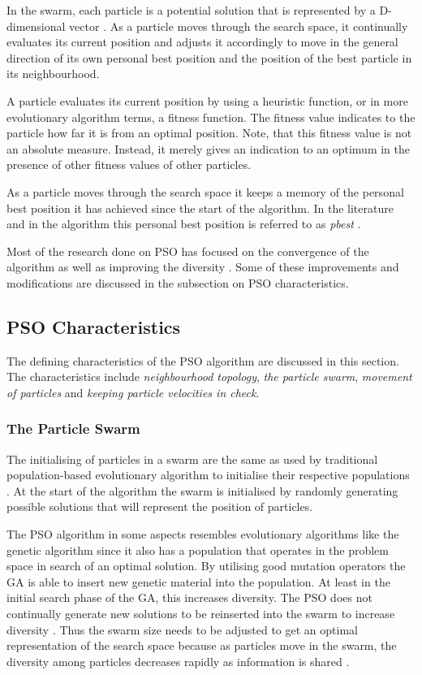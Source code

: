 In the swarm, each particle is a potential solution that is represented by a D-dimensional vector \cite{PSOHybridJobShop,PSOSelfHierarch}. As a particle moves through the search space, it continually evaluates its current position and adjusts it accordingly to move in the general direction of its own personal best position and the position of the best particle in its neighbourhood. 

A particle evaluates its current position by using a heuristic function, or in more evolutionary algorithm terms, a fitness function. The fitness value indicates to the particle how far it is from an optimal position\cite{CompuIntelligenceIntro}. Note, that this fitness value is not an absolute measure. Instead, it merely gives an indication to an optimum in the presence of other fitness values of other particles.

As a particle moves through the search space it keeps a memory of the personal best position it has achieved since the start of the algorithm. In the literature and in the algorithm this personal best position is referred to as \emph{pbest} \cite{SOSwarm}.

Most of the research done on \gls{PSO} has focused on the convergence of the algorithm as well as improving the diversity \cite{FundamentalSwarm}. Some of these improvements and modifications are discussed in the subsection on \gls{PSO} characteristics.

\subsection{PSO Characteristics}
\label{sec:psocharacteristics}
The defining characteristics of the \gls{PSO} algorithm are discussed in this section. The characteristics include \emph{neighbourhood topology}, \emph{the particle swarm}, \emph{movement of particles} and \emph{keeping particle velocities in check}.
\subsubsection{The Particle Swarm}
The initialising of particles in a swarm are the same as used by traditional population-based evolutionary algorithm to initialise their respective populations \cite{FixedFAPPSO}.  At the start of the algorithm the swarm is initialised by randomly generating possible solutions that will represent the position of particles\cite{CompuIntelligenceIntro}. 

The \gls{PSO} algorithm in some aspects resembles evolutionary algorithms like the genetic algorithm since it also has a population that operates in the problem space in search of an optimal solution. By utilising good mutation operators the \gls{GA} is able to insert new genetic material into the population. At least in the initial search phase of the GA, this increases diversity\cite{CompuIntelligenceIntro}. The \gls{PSO} does not continually generate new solutions to be reinserted into the swarm to increase diversity \cite{PSOHybridUnitCommit}. Thus the swarm size needs to be adjusted to get an optimal representation of the search space because as particles move in the swarm, the diversity among particles decreases rapidly as information is shared \cite{FundamentalSwarm,CompuIntelligenceIntro}. 


